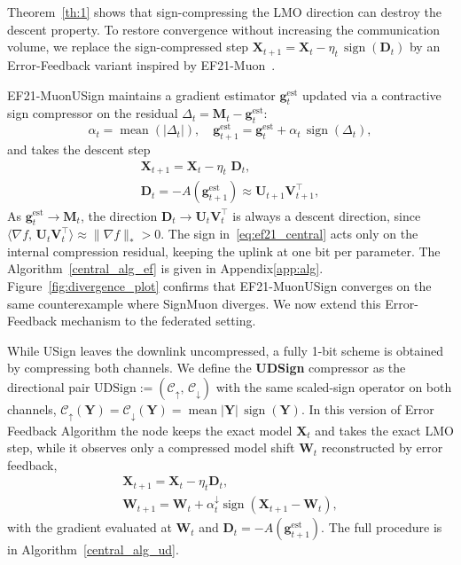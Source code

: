 \documentclass[letterpaper]{article} %
\begin{document}
Theorem~\ref{th:1} shows that sign-compressing the LMO direction can destroy the descent property. To restore convergence without increasing the communication volume, we replace the sign-compressed step $\mathbf{X}_{t+1}=\mathbf{X}_t -\eta_t\,\operatorname{sign}(\mathbf{D}_t)$ by an Error-Feedback variant inspired by EF21-Muon~\cite{gruntkowska2025error}.

EF21-MuonUSign maintains a gradient estimator $\mathbf{g}_t^{\mathrm{est}}$ updated via a contractive sign compressor on the residual $\Delta_t = \mathbf{M}_t - \mathbf{g}_t^{\mathrm{est}}$: 
\begin{equation}
\alpha_t = \operatorname{mean}(|\Delta_t|),\quad
\mathbf{g}_{t+1}^{\mathrm{est}} = \mathbf{g}_t^{\mathrm{est}} + \alpha_t\,\operatorname{sign}(\Delta_t),
\label{eq:ef21_central}
\end{equation}
and takes the descent step
\begin{multline}
\mathbf{X}_{t+1} = \mathbf{X}_t - \eta_t\,\,\mathbf{D}_t,
\\ \mathbf{D}_t = -A(\mathbf{g}_{t+1}^{\mathrm{est}}) \approx \mathbf{U}_{t+1}\mathbf{V}^\top_{t+1},
\label{eq:ef_step}
\end{multline}
As $\mathbf{g}_t^{\mathrm{est}}\to\mathbf{M}_t$, the direction
$\mathbf{D}_t \to \mathbf{U}_t\mathbf{V}_t^\top$ is always a descent direction,
since $\langle\nabla f,\,\mathbf{U}_t\mathbf{V}_t^\top\rangle \approx \|\nabla f\|_* > 0$.
The sign in~\eqref{eq:ef21_central} acts only on the internal compression residual, keeping the uplink at one bit per parameter. The Algorithm~\ref{central_alg_ef} is given in Appendix\ref{app:alg}. Figure~\ref{fig:divergence_plot} confirms that EF21-MuonUSign converges on the same counterexample where SignMuon diverges. We now extend this Error-Feedback mechanism to the federated setting.

While USign leaves the downlink uncompressed, a fully 1-bit scheme is obtained by compressing both channels. We define the \textbf{UDSign} compressor as the directional pair $\mathrm{UDSign}:=(\mathcal{C}_{\uparrow},\,\mathcal{C}_{\downarrow})$ with the same scaled-sign operator on both channels, $\mathcal{C}_{\uparrow}(\mathbf{Y})=\mathcal{C}_{\downarrow}(\mathbf{Y})=\operatorname{mean}|\mathbf{Y}|\,\operatorname{sign}(\mathbf{Y})$. In this version of Error Feedback Algorithm the node keeps the exact model $\mathbf{X}_t$ and takes the exact LMO step, while it observes only a compressed model shift  $\mathbf{W}_t$ reconstructed by error feedback,
\begin{multline}
  \mathbf{X}_{t+1}=\mathbf{X}_t-\eta_t\mathbf{D}_t,
\\\mathbf{W}_{t+1}=\mathbf{W}_t+\alpha_t^{\downarrow}\operatorname{sign}(\mathbf{X}_{t+1}-\mathbf{W}_t),
\end{multline}
with the gradient evaluated at $\mathbf{W}_t$ and $\mathbf{D}_t=-A(\mathbf{g}_{t+1}^{\mathrm{est}})$. The full procedure is in Algorithm~\ref{central_alg_ud}.
\end{document}
